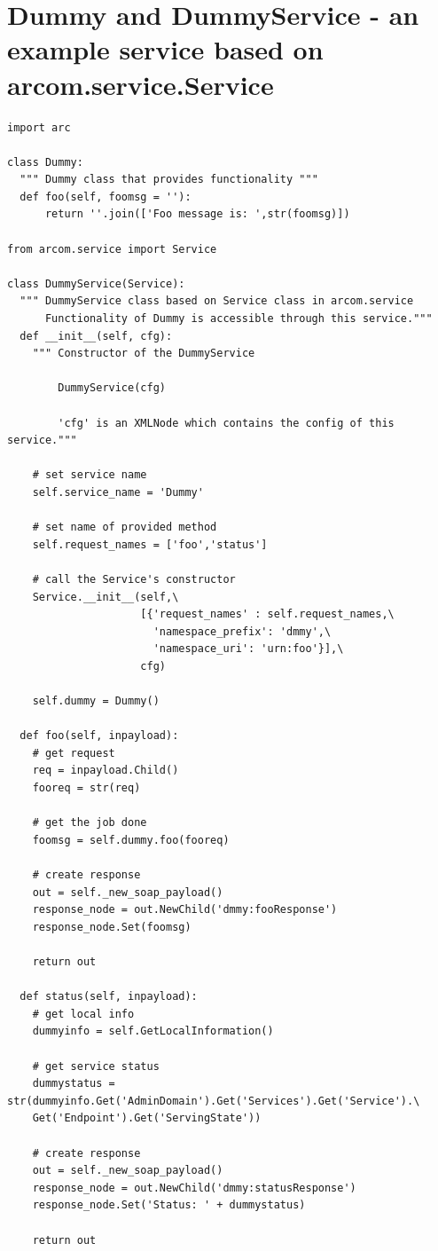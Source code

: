 \documentclass{article}
\begin{document}
\section{Dummy and DummyService - an example service based on arcom.service.Service}
\label{DummyServiceCode}
\begin{verbatim}
import arc

class Dummy:
  """ Dummy class that provides functionality """
  def foo(self, foomsg = ''):
      return ''.join(['Foo message is: ',str(foomsg)])

from arcom.service import Service

class DummyService(Service):
  """ DummyService class based on Service class in arcom.service 
      Functionality of Dummy is accessible through this service."""
  def __init__(self, cfg):
    """ Constructor of the DummyService
        
        DummyService(cfg)
        
        'cfg' is an XMLNode which contains the config of this service."""
    
    # set service name
    self.service_name = 'Dummy'
    
    # set name of provided method
    self.request_names = ['foo','status']
    
    # call the Service's constructor
    Service.__init__(self,\
                     [{'request_names' : self.request_names,\
                       'namespace_prefix': 'dmmy',\
                       'namespace_uri': 'urn:foo'}],\
                     cfg)
    
    self.dummy = Dummy()
    
  def foo(self, inpayload):
    # get request
    req = inpayload.Child()
    fooreq = str(req)
    
    # get the job done    
    foomsg = self.dummy.foo(fooreq)
    
    # create response
    out = self._new_soap_payload()
    response_node = out.NewChild('dmmy:fooResponse')    
    response_node.Set(foomsg)
    
    return out
    
  def status(self, inpayload):
    # get local info
    dummyinfo = self.GetLocalInformation()
    
    # get service status
    dummystatus = str(dummyinfo.Get('AdminDomain').Get('Services').Get('Service').\
    Get('Endpoint').Get('ServingState'))
    
    # create response
    out = self._new_soap_payload()
    response_node = out.NewChild('dmmy:statusResponse')    
    response_node.Set('Status: ' + dummystatus)
    
    return out
\end{verbatim}
\end{document}

